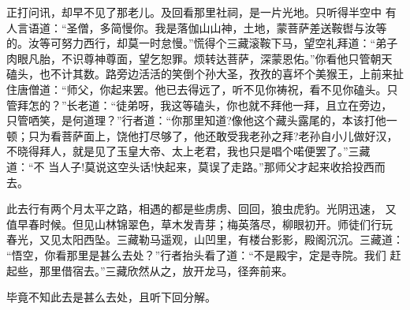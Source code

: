 正打问讯，却早不见了那老儿。及回看那里社祠，是一片光地。只听得半空中
有人言语道：“圣僧，多简慢你。我是落伽山山神，土地，蒙菩萨差送鞍辔与汝等
的。汝等可努力西行，却莫一时怠慢。”慌得个三藏滚鞍下马，望空礼拜道：“弟子
肉眼凡胎，不识尊神尊面，望乞恕罪。烦转达菩萨，深蒙恩佑。”你看他只管朝天
磕头，也不计其数。路旁边活活的笑倒个孙大圣，孜孜的喜坏个美猴王，上前来扯
住唐僧道：“师父，你起来罢。他已去得远了，听不见你祷祝，看不见你磕头。只
管拜怎的？”长老道：“徒弟呀，我这等磕头，你也就不拜他一拜，且立在旁边，
只管哂笑，是何道理？”行者道：“你那里知道?像他这个藏头露尾的，本该打他一
顿；只为看菩萨面上，饶他打尽够了，他还敢受我老孙之拜?老孙自小儿做好汉，
不晓得拜人，就是见了玉皇大帝、太上老君，我也只是唱个喏便罢了。”三藏道：“不
当人子!莫说这空头话!快起来，莫误了走路。”那师父才起来收拾投西而去。

此去行有两个月太平之路，相遇的都是些虏虏、回回，狼虫虎豹。光阴迅速，
又值早春时候。但见山林锦翠色，草木发青芽；梅英落尽，柳眼初开。师徒们行玩
春光，又见太阳西坠。三藏勒马遥观，山凹里，有楼台影影，殿阁沉沉。三藏道：
“悟空，你看那里是甚么去处？”行者抬头看了道：“不是殿宇，定是寺院。我们
赶起些，那里借宿去。”三藏欣然从之，放开龙马，径奔前来。

毕竟不知此去是甚么去处，且听下回分解。